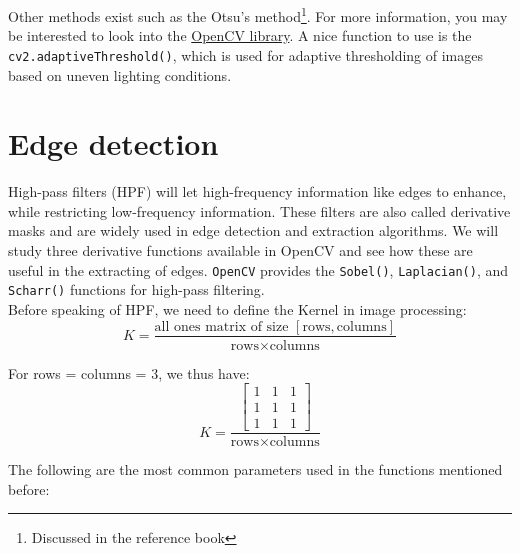 \documentclass{labo}
\newcommand{\opencv}{\texttt{OpenCV} }
\begin{document}
Other methods exist such as the Otsu’s method\footnote{Discussed in the reference book}. For more information, you may be interested to look into the \href{https://docs.opencv.org/4.x/d7/d4d/tutorial_py_thresholding.html}{OpenCV library}. A nice function to use is the \texttt{cv2.adaptiveThreshold()}, which is used for adaptive thresholding of images based on uneven lighting conditions.


\section*{Edge detection}
High-pass filters (HPF) will let high-frequency information like edges to enhance, while restricting low-frequency information. These filters are also called derivative masks and are widely used in edge detection and extraction algorithms. We will study three derivative functions available in OpenCV and see how these are useful in the extracting of edges. \opencv provides the \texttt{Sobel()}, \texttt{Laplacian()}, and \texttt{Scharr()} functions for high-pass filtering.\\

Before speaking of HPF, we need to define the Kernel in image processing:
\[K = \frac{\text{all ones matrix of size }[\text{rows}, \text{columns}]}{\text{rows} \times \text{columns}} \]

For rows = columns = 3, we thus have:
\[K = \frac{
\begin{bmatrix}
1 & 1 & 1\\
1 & 1 & 1\\
1 & 1 & 1
\end{bmatrix}
}{\text{rows} \times \text{columns}} \]

The following are the most common parameters used in the functions mentioned before:
\end{document}

